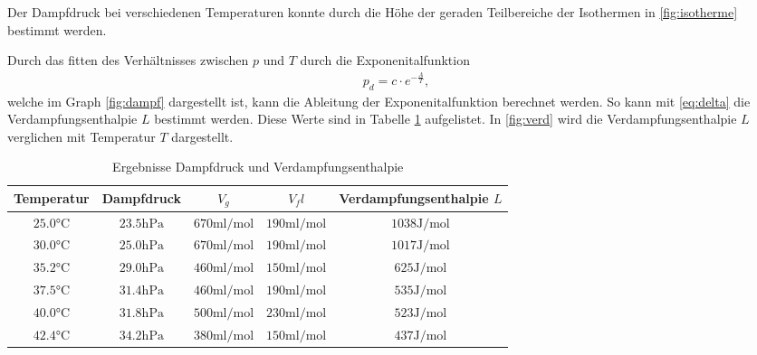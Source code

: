 \documentclass[11pt, a4paper]{article}
\begin{document}
    Der Dampfdruck bei verschiedenen Temperaturen konnte durch die Höhe der geraden Teilbereiche
    der Isothermen in \ref{fig:isotherme} bestimmt werden.
    

    Durch das fitten des Verhältnisses zwischen $p$ und $T$ durch die Exponenitalfunktion
    \begin{align}
        p_d = c \cdot e^{-\frac{A}{T}},
    \end{align}
    welche im Graph \ref{fig:dampf} dargestellt ist,
    kann die Ableitung der Exponenitalfunktion berechnet werden. So kann mit \ref{eq:delta}
    die Verdampfungsenthalpie $L$ bestimmt werden. Diese Werte sind in Tabelle \ref{tab:dampfmess}
    aufgelistet. In \ref{fig:verd} wird die Verdampfungsenthalpie $L$ verglichen mit Temperatur $T$ dargestellt.
    \begin{table}
        \begin{adjustwidth}{-.5in}{-.5in}
        \centering
        \begin{tabular}{c c c c c}
            Temperatur & Dampfdruck & $V_g$ & $V_fl$ & Verdampfungsenthalpie $L$ \\ \hline
            $25.0 \si{\celsius}$ & $23.5 \si{\hecto\pascal}$ & $670 \si{\milli\litre\per\mole} $ & $ 190  \si{\milli\litre\per\mole} $ & $ 1038 \si{\joule\per\mole} $ \\
            $30.0 \si{\celsius}$ & $25.0 \si{\hecto\pascal}$ & $670 \si{\milli\litre\per\mole} $ & $ 190  \si{\milli\litre\per\mole} $ & $ 1017 \si{\joule\per\mole} $ \\
            $35.2 \si{\celsius}$ & $29.0 \si{\hecto\pascal}$ & $460 \si{\milli\litre\per\mole} $ & $ 150  \si{\milli\litre\per\mole} $ & $ 625 \si{\joule\per\mole} $ \\
            $37.5 \si{\celsius}$ & $31.4 \si{\hecto\pascal}$ & $460 \si{\milli\litre\per\mole} $ & $ 190  \si{\milli\litre\per\mole} $ & $ 535 \si{\joule\per\mole} $ \\
            $40.0 \si{\celsius}$ & $31.8 \si{\hecto\pascal}$ & $500 \si{\milli\litre\per\mole} $ & $ 230  \si{\milli\litre\per\mole} $ & $ 523 \si{\joule\per\mole} $ \\
            $42.4 \si{\celsius}$ & $34.2 \si{\hecto\pascal}$ & $380 \si{\milli\litre\per\mole} $ & $ 150  \si{\milli\litre\per\mole} $ & $ 437 \si{\joule\per\mole} $
        \end{tabular}
        \caption{Ergebnisse Dampfdruck und Verdampfungsenthalpie}\label{tab:dampfmess}
        \end{adjustwidth}
    \end{table}
\end{document}
